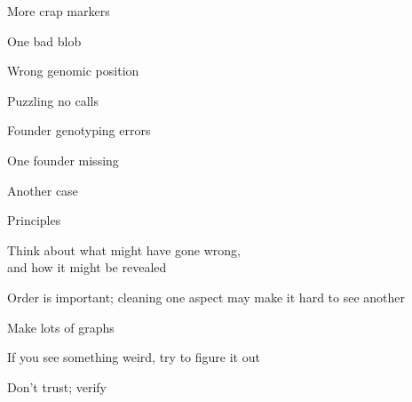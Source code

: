 \documentclass[aspectratio=169,12pt,t]{beamer}
\begin{document}
\begin{frame}[c]{More crap markers}

\note{
}
\end{frame}

\begin{frame}[c]{One bad blob}

\note{
}
\end{frame}

\begin{frame}[c]{Wrong genomic position}

\note{
}
\end{frame}

\begin{frame}[c]{Puzzling no calls}

\note{
}
\end{frame}



\begin{frame}[c]{}

\centerline{\Large \color{title} Founder genotyping errors}

\note{
}

\end{frame}


\begin{frame}[c]{One founder missing}

\note{
}
\end{frame}


\begin{frame}[c]{Another case}

\note{
}
\end{frame}


\begin{frame}[c]{Principles}

  \bbi
\item Think about what might have gone wrong, \\
  and how it might be revealed

 \item Order is important; cleaning one aspect may make it hard to see
   another

 \item Make lots of graphs

 \item If you see something weird, try to figure it out

 \item Don't trust; verify

   \ei

\note{
}

\end{frame}
\end{document}
